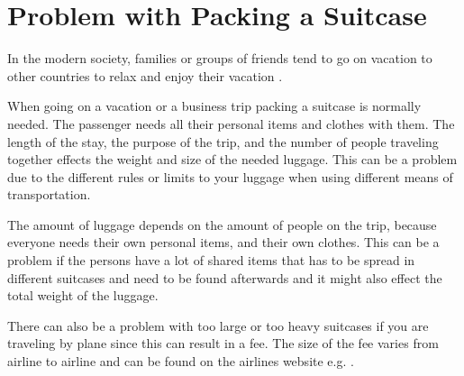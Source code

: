 \section{Problem with Packing a Suitcase}
In the modern society, families or groups of friends tend to go on vacation to other countries to relax and enjoy their vacation \citep{danskecharter}.

When going on a vacation or a business trip packing a suitcase is normally needed. The passenger needs all their personal items and clothes with them. The length of the stay, the purpose of the trip, and the number of people traveling together effects the weight and size of the needed luggage. This can be a problem due to the different rules or limits to your luggage when using different means of transportation.

 

The amount of luggage depends on the amount of people on the trip, because everyone needs their own personal items, and their own clothes. This can be a problem if the persons have a lot of shared items that has to be spread in different suitcases and need to be found afterwards and it might also effect the total weight of the luggage.

 
There can also be a problem with too large or too heavy suitcases if you are traveling by plane since this can result in a fee. The size of the fee varies from airline to airline and can be found on the airlines website e.g.  \citep{altombag}. 

